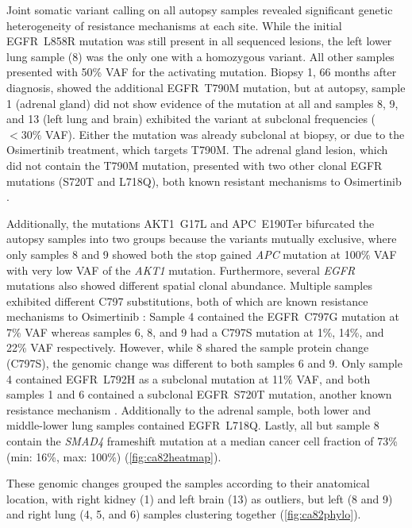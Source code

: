 Joint somatic variant calling on all autopsy samples revealed significant genetic heterogeneity of resistance mechanisms  at each site. While the initial EGFR~L858R mutation was still present in all sequenced lesions, the left lower lung sample (8) was the only one with a homozygous variant. All other samples presented with 50\% VAF for the activating mutation. Biopsy 1, 66 months after diagnosis, showed the additional EGFR~T790M mutation, but at autopsy, sample 1 (adrenal gland) did not show evidence of the mutation at all and samples 8, 9, and 13 (left lung and brain) exhibited the variant at subclonal frequencies ($<30\%$ VAF). Either the mutation was already subclonal at biopsy, or  due to the Osimertinib treatment, which targets T790M. The adrenal gland lesion, which did not contain the T790M mutation,  presented with two other clonal EGFR mutations (S720T and L718Q),  both known resistant mechanisms to Osimertinib \cite{Johnson2010,Bersanelli2016}.

Additionally, the mutations AKT1~G17L and APC~E190Ter bifurcated the  autopsy samples into two groups because the variants  mutually exclusive, where only samples 8 and 9 showed both the stop gained \textit{APC} mutation at 100\% VAF with very low VAF of the \textit{AKT1} mutation. Furthermore, several \textit{EGFR} mutations also showed different spatial clonal abundance. Multiple samples exhibited different C797 substitutions, both of which are known resistance mechanisms to Osimertinib \cite{Wang2016,Leonetti2019}: Sample 4 contained the EGFR~C797G mutation at 7\% VAF whereas samples 6, 8, and 9 had a C797S mutation at 1\%, 14\%, and 22\% VAF respectively. However, while 8 shared the sample protein change (C797S), the genomic change was different to both samples 6 and 9. Only sample 4 contained EGFR~L792H as a subclonal mutation at 11\% VAF, and both samples 1 and 6 contained a subclonal EGFR~S720T mutation, another known resistance mechanism \cite{Johnson2010,Zhang2018b}. Additionally to the adrenal sample, both lower and middle-lower lung samples contained EGFR~L718Q. 
Lastly, all but sample 8 contain the \textit{SMAD4} frameshift mutation at a median cancer cell fraction of 73\% (min: 16\%, max: 100\%) (\autoref{fig:ca82heatmap}).

These genomic changes grouped the samples according to their anatomical location, with  right kidney (1) and left brain (13) as outliers, but left (8 and 9) and right lung (4, 5, and 6) samples clustering together (\autoref{fig:ca82phylo}).

